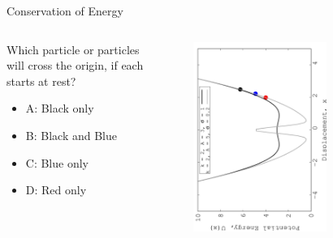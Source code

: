 \documentclass{beamer}
\begin{document}
\begin{frame}{Conservation of Energy}
\begin{columns}[T]
\begin{column}{0.3\textwidth}
\small
Which particle or particles will cross the origin, if each starts at rest?
\begin{itemize}
\item A: Black only
\item B: Black and Blue
\item C: Blue only
\item D: Red only
\end{itemize}
\end{column}
\begin{column}{0.7\textwidth}
\begin{figure}
\centering
\includegraphics[width=0.7\textwidth,angle=270]{figures/Nov14_plot1.jpg}
\end{figure}
\end{column}
\end{columns}
\end{frame}
\end{document}
